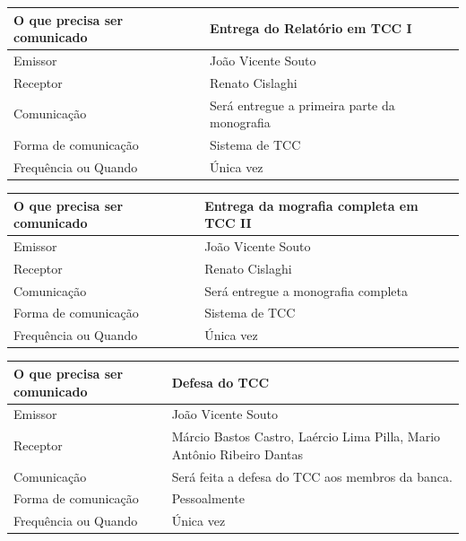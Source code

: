 \documentclass[
	12pt,				%
	openright,			%
	twoside,			%
	a4paper,			%
	english,			%
	brazil,				%
	]{abntex2}
\begin{document}
\begin{center}
\begin{tabular}{|l|p{9cm}|}
\hline
    O que precisa ser comunicado & Entrega do Relatório em TCC I \\ \hline
    Emissor & João Vicente Souto \\ \hline
    Receptor & Renato Cislaghi \\ \hline
    Comunicação & Será entregue a primeira parte da monografia \\ \hline
    Forma de comunicação & Sistema de TCC \\ \hline
    Frequência ou Quando & Única vez \\ \hline
\end{tabular}
\end{center}

\begin{center}
\begin{tabular}{|l|p{9cm}|}
\hline
    O que precisa ser comunicado & Entrega da mografia completa em TCC II \\ \hline
    Emissor & João Vicente Souto \\ \hline
    Receptor & Renato Cislaghi \\ \hline
    Comunicação & Será entregue a monografia completa \\ \hline
    Forma de comunicação & Sistema de TCC \\ \hline
    Frequência ou Quando & Única vez \\ \hline
\end{tabular}
\end{center}

\begin{center}
\begin{tabular}{|l|p{9cm}|}
\hline
    O que precisa ser comunicado & Defesa do TCC \\ \hline
    Emissor & João Vicente Souto \\ \hline
    Receptor & Márcio Bastos Castro, Laércio Lima Pilla, Mario Antônio Ribeiro Dantas\\ \hline
    Comunicação & Será feita a defesa do TCC aos membros da banca.  \\ \hline
    Forma de comunicação & Pessoalmente \\ \hline
    Frequência ou Quando & Única vez \\ \hline
\end{tabular}
\end{center}
\end{document}
